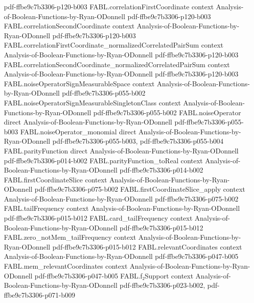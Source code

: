 \begin{theorem}
  {pdf-ffbe9c7b3306-p120-b003}
\proofstep
  {FABL.correlationFirstCoordinate}
  {context}
  {Analysis-of-Boolean-Functions-by-Ryan-ODonnell}
  {pdf-ffbe9c7b3306-p120-b003}
\proofstep
  {FABL.correlationSecondCoordinate}
  {context}
  {Analysis-of-Boolean-Functions-by-Ryan-ODonnell}
  {pdf-ffbe9c7b3306-p120-b003}
\proofstep
  {FABL.correlationFirstCoordinate_normalizedCorrelatedPairSum}
  {context}
  {Analysis-of-Boolean-Functions-by-Ryan-ODonnell}
  {pdf-ffbe9c7b3306-p120-b003}
\proofstep
  {FABL.correlationSecondCoordinate_normalizedCorrelatedPairSum}
  {context}
  {Analysis-of-Boolean-Functions-by-Ryan-ODonnell}
  {pdf-ffbe9c7b3306-p120-b003}
\proofstep
  {FABL.noiseOperatorSignMeasurableSpace}
  {context}
  {Analysis-of-Boolean-Functions-by-Ryan-ODonnell}
  {pdf-ffbe9c7b3306-p055-b002}
\proofstep
  {FABL.noiseOperatorSignMeasurableSingletonClass}
  {context}
  {Analysis-of-Boolean-Functions-by-Ryan-ODonnell}
  {pdf-ffbe9c7b3306-p055-b002}
\proofstep
  {FABL.noiseOperator}
  {direct}
  {Analysis-of-Boolean-Functions-by-Ryan-ODonnell}
  {pdf-ffbe9c7b3306-p055-b003}
\proofstep
  {FABL.noiseOperator_monomial}
  {direct}
  {Analysis-of-Boolean-Functions-by-Ryan-ODonnell}
  {pdf-ffbe9c7b3306-p055-b003,
    pdf-ffbe9c7b3306-p055-b004}
\proofstep
  {FABL.parityFunction}
  {direct}
  {Analysis-of-Boolean-Functions-by-Ryan-ODonnell}
  {pdf-ffbe9c7b3306-p014-b002}
\proofstep
  {FABL.parityFunction_toReal}
  {context}
  {Analysis-of-Boolean-Functions-by-Ryan-ODonnell}
  {pdf-ffbe9c7b3306-p014-b002}
\proofstep
  {FABL.firstCoordinateSlice}
  {context}
  {Analysis-of-Boolean-Functions-by-Ryan-ODonnell}
  {pdf-ffbe9c7b3306-p075-b002}
\proofstep
  {FABL.firstCoordinateSlice_apply}
  {context}
  {Analysis-of-Boolean-Functions-by-Ryan-ODonnell}
  {pdf-ffbe9c7b3306-p075-b002}
\proofstep
  {FABL.tailFrequency}
  {context}
  {Analysis-of-Boolean-Functions-by-Ryan-ODonnell}
  {pdf-ffbe9c7b3306-p015-b012}
\proofstep
  {FABL.card_tailFrequency}
  {context}
  {Analysis-of-Boolean-Functions-by-Ryan-ODonnell}
  {pdf-ffbe9c7b3306-p015-b012}
\proofstep
  {FABL.zero_notMem_tailFrequency}
  {context}
  {Analysis-of-Boolean-Functions-by-Ryan-ODonnell}
  {pdf-ffbe9c7b3306-p015-b012}
\proofstep
  {FABL.relevantCoordinates}
  {context}
  {Analysis-of-Boolean-Functions-by-Ryan-ODonnell}
  {pdf-ffbe9c7b3306-p047-b005}
\proofstep
  {FABL.mem_relevantCoordinates}
  {context}
  {Analysis-of-Boolean-Functions-by-Ryan-ODonnell}
  {pdf-ffbe9c7b3306-p047-b005}
\proofstep
  {FABL.f₂Support}
  {context}
  {Analysis-of-Boolean-Functions-by-Ryan-ODonnell}
  {pdf-ffbe9c7b3306-p023-b002,
    pdf-ffbe9c7b3306-p071-b009}

\end{theorem}
